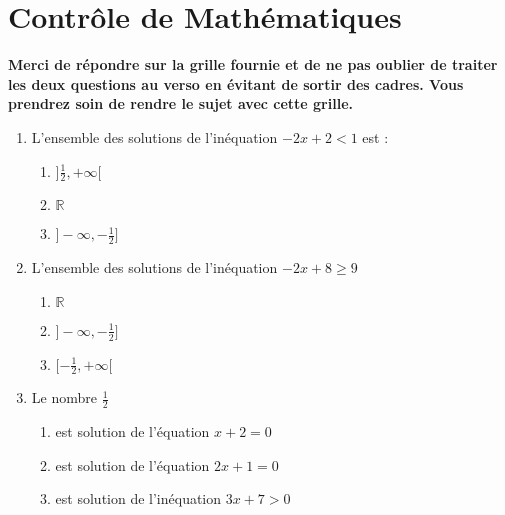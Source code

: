 \documentclass[oneside,twocolumn,landscape]{book}
\begin{document}
\section*{Contrôle de Mathématiques}

\let\MauvaiseReponse\null
\let\BonneReponse\null

{\bf Merci de répondre sur la grille fournie et de ne pas oublier de traiter les deux questions au verso en évitant de sortir des cadres. Vous prendrez soin de rendre le sujet avec cette grille.}
\vspace{2em}





\begin{enumerate}





\item L'ensemble des solutions de l'inéquation $-2 x+2<1$ est :
\begin{enumerate}
\item\BonneReponse $]\frac{1}{2},+\infty[$
\item\MauvaiseReponse $\mathbb{R}$
\item\MauvaiseReponse $]-\infty, -\frac{1}{2}]$
\end{enumerate}


\item L'ensemble des solutions de l'inéquation $-2x+8 \geqslant 9$

\begin{enumerate}

\item\MauvaiseReponse $\mathbb{R}$


\item\BonneReponse $]-\infty,-\frac{1}{2}]$
\item\MauvaiseReponse $[-\frac{1}{2},+\infty[$

\end{enumerate}





\item Le nombre $\frac{1}{2}$

\begin{enumerate}

\item\MauvaiseReponse est solution de l'équation $x+2=0$
\item\MauvaiseReponse est solution de l'équation $2x+1=0$


\item\BonneReponse est solution de l'inéquation $3x+7>0$


\end{enumerate}
\end{enumerate}
\end{document}
